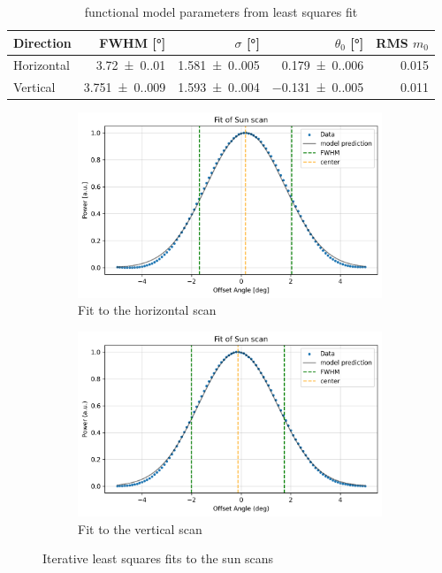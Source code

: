 \begin{table}[H]
    \centering
    \begin{tabular}{lrrrr}
        \toprule
        Direction & FWHM [\si{\degree}] & $\sigma$  [\si{\degree}] & $\theta_0$ [\si{\degree}] & RMS $m_0$\\
        \midrule
        Horizontal & \SI{3.72(0.01)}{}   & \SI{1.581(0.005)}{} & \SI{ 0.179(0.006)}{} & 0.015\\
        Vertical   & \SI{3.751(0.009)}{} & \SI{1.593(0.004)}{} & \SI{-0.131(0.005)}{} & 0.011\\
        \bottomrule
    \end{tabular}
    \caption{functional model parameters from least squares fit}
    \label{tab:params}
\end{table}
\begin{figure}[H]
    \centering
    \begin{subfigure}[b]{0.45\textwidth}
        \centering
        \includegraphics[width=\textwidth]{assets/sun_scan_fit_h.png}
        \caption{Fit to the horizontal scan}
        \label{fig:sun_fit_h}
    \end{subfigure}
    \hfill
    \begin{subfigure}[b]{0.45\textwidth}
        \centering
        \includegraphics[width=\textwidth]{assets/sun_scan_fit_v.png}
        \caption{Fit to the vertical scan}
        \label{fig:sun_fit_v}
    \end{subfigure}
    \caption{Iterative least squares fits to the sun scans}
    \label{fig:sun_scan_fit}
\end{figure}

